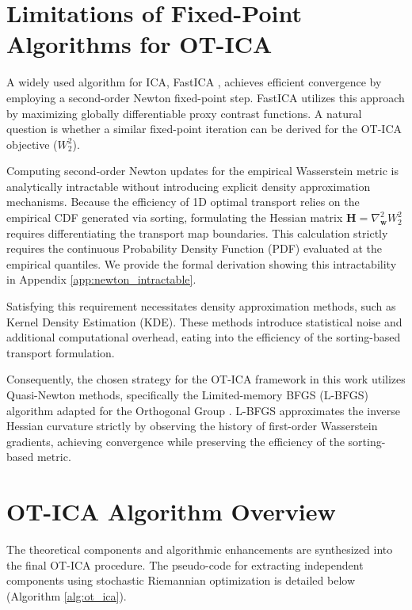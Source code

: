 \documentclass[12pt,a4paper,twoside,openany]{book}
\begin{document}
\section{Limitations of Fixed-Point Algorithms for OT-ICA}
A widely used algorithm for ICA, FastICA \cite[Chapter 8]{hyvarinen2001}, achieves efficient convergence by employing a second-order Newton fixed-point step. 
FastICA utilizes this approach by maximizing globally differentiable proxy contrast functions. 
A natural question is whether a similar fixed-point iteration can be derived for the OT-ICA objective ($W_2^2$). 

Computing second-order Newton updates for the empirical Wasserstein metric is analytically intractable without introducing explicit density approximation mechanisms. 
Because the efficiency of 1D optimal transport relies on the empirical CDF generated via sorting, formulating the 
Hessian matrix $\mathbf{H} = \nabla^2_{\mathbf{w}} W_2^2$ requires differentiating the transport map boundaries. 
This calculation strictly requires the continuous Probability Density Function (PDF) evaluated at the empirical quantiles. 
We provide the formal derivation showing this intractability in Appendix \ref{app:newton_intractable}.

Satisfying this requirement necessitates density approximation methods, such as Kernel Density Estimation (KDE). 
These methods introduce statistical noise and additional computational overhead, eating into the efficiency of the sorting-based transport formulation.

Consequently, the chosen strategy for the OT-ICA framework in this work utilizes Quasi-Newton methods, specifically the Limited-memory BFGS (L-BFGS) algorithm \cite{liu1989limited} 
adapted for the Orthogonal Group \cite[Chapter 6]{absil2008optimization}. L-BFGS approximates the inverse Hessian curvature strictly by observing 
the history of first-order Wasserstein gradients, achieving convergence while preserving the efficiency of the sorting-based metric.

\section{OT-ICA Algorithm Overview}
The theoretical components and algorithmic enhancements are synthesized into the final OT-ICA procedure. 
The pseudo-code for extracting independent components using stochastic Riemannian optimization is detailed below (Algorithm \ref{alg:ot_ica}).
\end{document}
